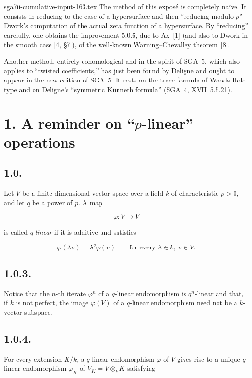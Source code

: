 \begin{filecontents*}{sga7ii-cumulative-input-163.tex}
The method of this exposé is completely naïve. It consists in reducing to the
case of a hypersurface and then ``reducing modulo $p$'' Dwork's computation
of the actual zeta function of a hypersurface. By ``reducing'' carefully, one
obtains the improvement 5.0.6, due to Ax~[1] (and also to Dwork in the smooth
case [4, \S 7]), of the well-known Warning--Chevalley theorem~[8].

Another method, entirely cohomological and in the spirit of SGA~5, which also
applies to ``twisted coefficients,'' has just been found by Deligne and ought
to appear in the new edition of SGA~5. It rests on the trace formula of Woods
Hole type and on Deligne's ``symmetric Künneth formula''
(SGA~4, XVII~5.5.21).

\section*{1. A reminder on ``$p$-linear'' operations}

\subsection*{1.0.}
Let $V$ be a finite-dimensional vector space over a field $k$ of
characteristic $p>0$, and let $q$ be a power of $p$. A map

\begin{equation}\tag{1.0.1}
\varphi:V\longrightarrow V
\end{equation}

is called $q$-\emph{linear} if it is additive and satisfies

\begin{equation}\tag{1.0.2}
\varphi(\lambda v)=\lambda^q\varphi(v)
\qquad\text{for every }\lambda\in k,\ v\in V.
\end{equation}

\subsection*{1.0.3.}
Notice that the $n$-th iterate $\varphi^n$ of a $q$-linear endomorphism is
$q^n$-linear and that, if $k$ is not perfect, the image $\varphi(V)$ of a
$q$-linear endomorphism need not be a $k$-vector subspace.

\subsection*{1.0.4.}
For every extension $K/k$, a $q$-linear endomorphism $\varphi$ of $V$ gives
rise to a unique $q$-linear endomorphism $\varphi_K$ of
$V_K=V\otimes_kK$ satisfying


\end{filecontents*}
